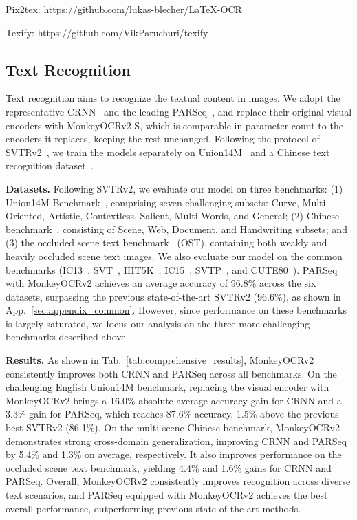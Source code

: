 \documentclass{article}
\begin{document}
\begin{table}[t]
{\begin{threeparttable}
\begin{tablenotes}
\footnotesize
\setlength{\itemsep}{0pt}
\setlength{\parskip}{0pt}
\raggedright
\item[1] Pix2tex: https://github.com/lukas-blecher/LaTeX-OCR
\item[2] Texify: https://github.com/VikParuchuri/texify
\end{tablenotes}

\end{threeparttable}
}
\end{table}

\subsection{Text Recognition}
    Text recognition aims to recognize the textual content in images. 
    We adopt the representative CRNN~\cite{crnn} and the leading PARSeq~\cite{parseq}, and replace their original visual encoders with MonkeyOCRv2-S, which is comparable in parameter count to the encoders it replaces, keeping the rest unchanged.
    Following the protocol of SVTRv2~\cite{svtrv2}, we train the models separately on Union14M~\cite{union14m} and a Chinese text recognition dataset~\cite{chinesetext}.

    \textbf{Datasets.} Following SVTRv2, we evaluate our model on three benchmarks: (1) Union14M-Benchmark~\cite{union14m}, comprising seven challenging subsets: Curve, Multi-Oriented, Artistic, Contextless, Salient, Multi-Words, and General; (2) Chinese benchmark~\cite{chinesetext}, consisting of Scene, Web, Document, and Handwriting subsets; and  (3) the occluded scene text benchmark~\cite{ost} (OST), containing both weakly and heavily occluded scene text images.
    We also evaluate our model on the common benchmarks (IC13~\cite{ic13}, SVT~\cite{svt}, IIIT5K~\cite{IIIT5K}, IC15~\cite{ic15}, SVTP~\cite{SVTP}, and CUTE80~\cite{cute80}). PARSeq with MonkeyOCRv2 achieves an average accuracy of 96.8\% across the six datasets, surpassing the previous state-of-the-art SVTRv2 (96.6\%), as shown in App.~\ref{sec:appendix_common}. However, since performance on these benchmarks is largely saturated, we focus our analysis on the three more challenging benchmarks described above.

    \textbf{Results.} As shown in Tab.~\ref{tab:comprehensive_results}, MonkeyOCRv2 consistently improves both CRNN and PARSeq across all benchmarks. On the challenging English Union14M benchmark, replacing the visual encoder with MonkeyOCRv2 brings a 16.0\% absolute average accuracy gain for CRNN and a 3.3\% gain for PARSeq, which reaches 87.6\% accuracy, 1.5\% above the previous best SVTRv2 (86.1\%). On the multi-scene Chinese benchmark, MonkeyOCRv2 demonstrates strong cross-domain generalization, improving CRNN and PARSeq by 5.4\% and 1.3\%  on average, respectively. It also improves performance on the occluded scene text benchmark, yielding 4.4\% and 1.6\% gains for CRNN and PARSeq. Overall, MonkeyOCRv2 consistently improves recognition across diverse text scenarios, and PARSeq equipped with MonkeyOCRv2 achieves the best overall performance, outperforming previous state-of-the-art methods.
    
\end{document}
